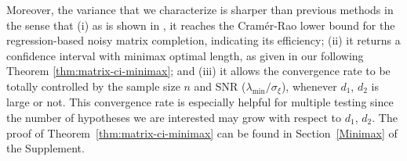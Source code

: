 \documentclass[12pt]{article}
\theoremstyle{plain}
\begin{document}
\begin{sloppypar}
{%


Moreover, the variance that we characterize is sharper than previous methods \citep{chen2019inference,xia2021statistical,farias2022uncertainty} in the sense that (i) as is shown in \cite{ma2024statistical}, it reaches the Cramér-Rao lower bound for the regression-based noisy matrix completion, indicating its efficiency; (ii) it returns a confidence interval with minimax optimal length, as given in our following Theorem \ref{thm:matrix-ci-minimax}; and (iii) it allows the convergence rate to be totally controlled by the sample size $n$ and SNR ($\lambda_{\min}/\sigma_{\xi}$), whenever $d_1$, $d_2$ is large or not. This convergence rate is especially helpful for multiple testing since the number of hypotheses we are interested may grow with respect to $d_1$, $d_2$. The proof of Theorem~\ref{thm:matrix-ci-minimax} can be found in Section~\ref{Minimax} of the Supplement. 

}
\end{sloppypar}
\end{document}
